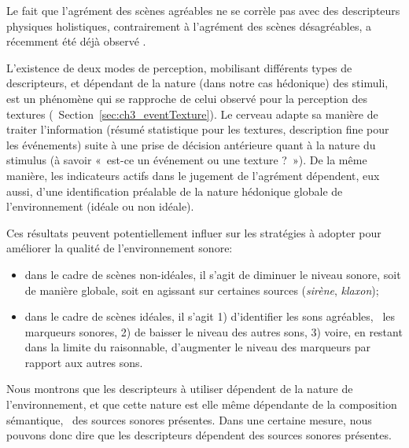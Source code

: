 Le fait que l'agrément des scènes agréables ne se corrèle pas avec des descripteurs physiques holistiques, contrairement à l'agrément des scènes désagréables, a récemment été déjà observé \citep{gozalo2015relationship}.

L'existence de deux modes de perception, mobilisant différents types de descripteurs, et dépendant de la nature (dans notre cas hédonique) des stimuli, est un phénomène qui se rapproche de celui observé pour la perception des textures (\cf~Section~\ref{sec:ch3_eventTexture}). Le cerveau adapte sa manière de traiter l'information (résumé statistique pour les textures, description fine pour les événements) suite à une prise de décision antérieure quant à la nature du stimulus (à savoir «~est-ce un événement ou une texture ?~»). De la même manière, les indicateurs actifs dans le jugement de l'agrément dépendent, eux aussi, d'une identification préalable de la nature hédonique globale de l'environnement (idéale ou non idéale).

Ces résultats peuvent potentiellement influer sur les stratégies à adopter pour améliorer la qualité de l’environnement sonore:

\begin{itemize}
\item dans le cadre de scènes non-idéales, il s'agit de diminuer le niveau sonore, soit de manière globale, soit en agissant sur certaines sources (\emph{sirène}, \emph{klaxon});
\item dans le cadre de scènes idéales, il s'agit 1) d'identifier les sons agréables, \ie~les marqueurs sonores, 2) de baisser le niveau des autres sons, 3) voire, en restant dans la limite du raisonnable, d'augmenter le niveau des marqueurs par rapport aux autres sons.
\end{itemize}

Nous montrons que les descripteurs à utiliser dépendent de la nature de l'environnement, et que cette nature est elle même dépendante de la composition sémantique, \ie~des sources sonores présentes. Dans une certaine mesure, nous pouvons donc dire que les descripteurs dépendent des sources sonores présentes. 


